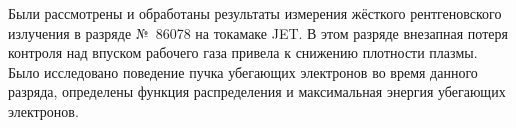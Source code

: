 Были рассмотрены и обработаны результаты измерения жёсткого рентгеновского излучения в разряде №~86078 на токамаке JET. В этом разряде внезапная потеря контроля над впуском рабочего газа привела к снижению плотности плазмы. Было исследовано поведение пучка убегающих электронов во время данного разряда, определены функция распределения и максимальная энергия убегающих электронов. 


\clearpage
